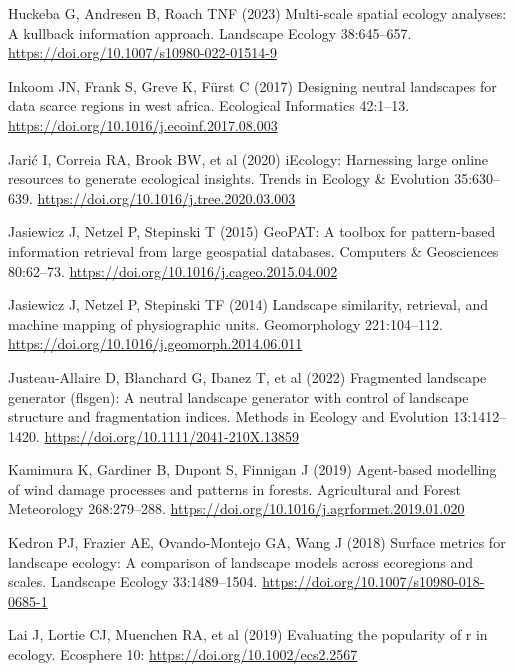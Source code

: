 \documentclass[
  10pt,
  a4paperpaper,
]{article}
\newlength{\cslhangindent}
\newenvironment{CSLReferences}[2] %
 {\begin{list}{}{%
  \setlength{\itemindent}{0pt}
  \setlength{\leftmargin}{0pt}
  \setlength{\parsep}{0pt}
  \ifodd #1
   \setlength{\leftmargin}{\cslhangindent}
   \setlength{\itemindent}{-1\cslhangindent}
  \fi
  \setlength{\itemsep}{#2\baselineskip}}}
 {\end{list}}
\begin{document}
\begin{CSLReferences}{1}{1}
Huckeba G, Andresen B, Roach TNF (2023) Multi-scale spatial ecology
analyses: A kullback information approach. Landscape Ecology
38:645--657. \url{https://doi.org/10.1007/s10980-022-01514-9}

Inkoom JN, Frank S, Greve K, Fürst C (2017) Designing neutral landscapes
for data scarce regions in west africa. Ecological Informatics 42:1--13.
\url{https://doi.org/10.1016/j.ecoinf.2017.08.003}

Jarić I, Correia RA, Brook BW, et al (2020) iEcology: Harnessing large
online resources to generate ecological insights. Trends in Ecology \&
Evolution 35:630--639. \url{https://doi.org/10.1016/j.tree.2020.03.003}

Jasiewicz J, Netzel P, Stepinski T (2015) GeoPAT: A toolbox for
pattern-based information retrieval from large geospatial databases.
Computers \& Geosciences 80:62--73.
\url{https://doi.org/10.1016/j.cageo.2015.04.002}

Jasiewicz J, Netzel P, Stepinski TF (2014) Landscape similarity,
retrieval, and machine mapping of physiographic units. Geomorphology
221:104--112. \url{https://doi.org/10.1016/j.geomorph.2014.06.011}

Justeau-Allaire D, Blanchard G, Ibanez T, et al (2022) Fragmented
landscape generator (flsgen): A neutral landscape generator with control
of landscape structure and fragmentation indices. Methods in Ecology and
Evolution 13:1412--1420. \url{https://doi.org/10.1111/2041-210X.13859}

Kamimura K, Gardiner B, Dupont S, Finnigan J (2019) Agent-based
modelling of wind damage processes and patterns in forests. Agricultural
and Forest Meteorology 268:279--288.
\url{https://doi.org/10.1016/j.agrformet.2019.01.020}

Kedron PJ, Frazier AE, Ovando-Montejo GA, Wang J (2018) Surface metrics
for landscape ecology: A comparison of landscape models across
ecoregions and scales. Landscape Ecology 33:1489--1504.
\url{https://doi.org/10.1007/s10980-018-0685-1}

Lai J, Lortie CJ, Muenchen RA, et al (2019) Evaluating the popularity of
r in ecology. Ecosphere 10: \url{https://doi.org/10.1002/ecs2.2567}


\end{CSLReferences}
\end{document}
